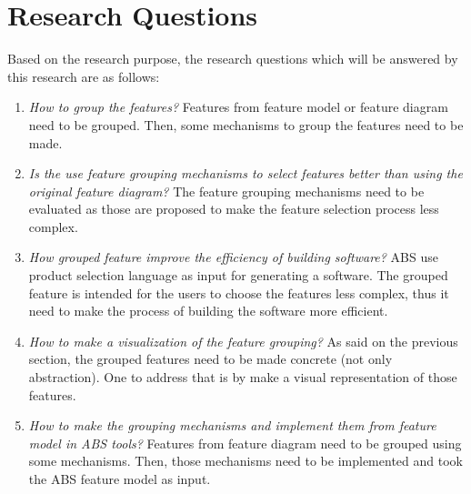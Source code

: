 \section{Research Questions}
Based on the research purpose, the research questions which will be answered by this research are as follows:
\begin{enumerate}
	\item {\it How to group the features?}
	Features from feature model or feature diagram need to be grouped. Then, some mechanisms to group the features need to be made.
	
	\item {\it Is the use feature grouping mechanisms to select features better than using the original feature diagram?}
	The feature grouping mechanisms need to be evaluated as those are proposed to make the feature selection process less complex.
	
	\item {\it How grouped feature improve the efficiency of building software?}
	ABS use product selection language as input for generating a software. The grouped feature is intended for the users to choose the features less complex, thus it need to make the process of building the software more efficient.
	
	\item {\it How to make a visualization of the feature grouping?}
	As said on the previous section, the grouped features need to be made concrete (not only abstraction). One to address that is by make a visual representation of those features.
	
	\item {\it How to make the grouping mechanisms and implement them from feature model in ABS tools?}
	Features from feature diagram need to be grouped using some mechanisms. Then, those mechanisms need to be implemented and took the ABS feature model as input.
\end{enumerate}

